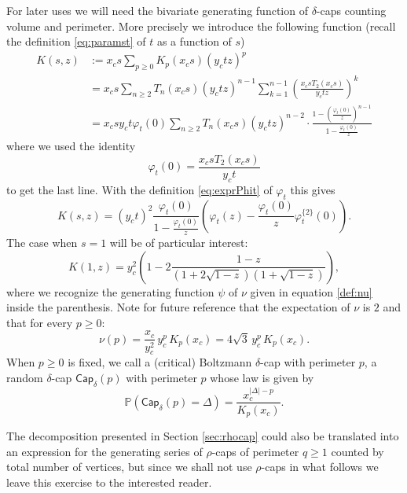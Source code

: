 \documentclass[AHL,XML,longabstracts,Unicode,NoSaveZebib]{cedram}
\begin{document}
For later uses we will need the bivariate generating function of $\delta$-caps counting volume and perimeter. More precisely we introduce the following function (recall the definition \eqref{eq:paramst} of $t$ as a function of $s$)
\begin{align}
K(s,z) &:= x_c s \sum_{p\geq 0} K_p(x_c s) \left(y_c t z\right)^p\label{def:K} \\
&= x_c s \sum_{n \geq 2} T_n(x_c s) (y_c t z)^{n-1} \sum_{k=1}^{n-1} \left( \frac{x_c s T_2 (x_c s)}{y_c t z}\right)^k\nonumber \\
& = x_c s y_c t \varphi_t (0) \sum_{n \geq 2} T_n(x_c s) (y_c t z)^{n-2} \cdot \frac{1 - \left(\frac{\varphi_t (0)}{z}\right)^{n-1}}{1 - \frac{\varphi_t (0)}{z}} \nonumber
\end{align}
where we used the identity
\[
\varphi_t(0) = \frac{x_c s T_2(x_c s)}{y_c t}
\]
to get the last line. With the definition \eqref{eq:exprPhit} of $\varphi_t$ this gives
\begin{equation}
\label{eq:Ksz}
K(s,z) = (y_c t)^2 \frac{\varphi_t (0)}{1 - \frac{\varphi_t (0)}{z}} \left(\varphi_t(z) - \frac{\varphi_t(0)}{z} \varphi^{\{2\}}_t(0) \right).
\end{equation}
The case when $s=1$ will be of particular interest:
\[
K(1,z) = y_c^2 \left( 1-2\frac{1-z}{(1+2\sqrt{1-z})(1+\sqrt{1-z})} \right),
\]
where we recognize the generating function $\psi$ of $\nu$ given in equation \eqref{def:nu} inside the parenthesis. Note for future reference that the expectation of $\nu$ is $2$ and that for every $p \geq 0$:
\begin{equation}
\label{eq:nuval}
\nu(p) = \frac{x_c}{y_c^2} \, y_c^p \, K_p(x_c) = 4 \sqrt 3 \, y_c^p \, K_p(x_c).
\end{equation}
When $p \geq 0$ is fixed, we call a (critical) Boltzmann $\delta$-cap with perimeter $p$, a random $\delta$-cap $ \mathsf{Cap}_{\delta}(p)$ with perimeter $p$ whose law is given by
\begin{equation} \label{eq:BolKip}
\mathbb{P}(\mathsf{Cap}_{\delta}(p) = \Delta) = \frac{x_{c}^{|\Delta|-p}}{K_{p}(x_{c})}.
\end{equation}

\bigskip

The decomposition presented in Section \ref{sec:rhocap}  could also be translated into an expression for the generating series of $\rho$-caps of perimeter $q \geq 1$ counted by total number of vertices, but since we shall not use $\rho$-caps in what follows we leave this exercise to the interested reader.
\end{document}
